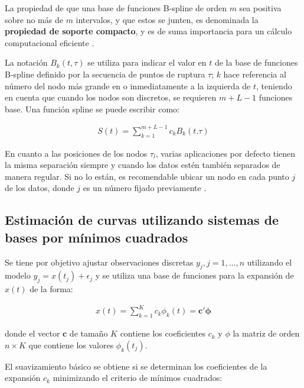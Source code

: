 \documentclass[
]{book}
\begin{document}
La propiedad de que una base de funciones B-spline de orden \(m\) sea positiva sobre no más de \(m\) intervalos, y que estos se junten, es denominada la \textbf{propiedad de soporte compacto}, y es de suma importancia para un cálculo computacional eficiente \citep{ramsay}.

La notación \(B_k(t,\tau)\) se utiliza para indicar el valor en \(t\) de la base de funciones B-spline definido por la secuencia de puntos de ruptura \(\tau\); \(k\) hace referencia al número del nodo más grande en o inmediatamente a la izquierda de \(t\), teniendo en cuenta que cuando los nodos son discretos, se requieren \(m+L-1\) funciones base. Una función spline se puede escribir como:

\begin{align}
    S(t)=\sum_{k=1}^{m+L-1} {c_{k}B_{k}(t.\tau)}
\end{align}

En cuanto a las posiciones de los nodos \(\tau_l\), varias aplicaciones por defecto tienen la misma separación siempre y cuando los datos estén también separados de manera regular. Si no lo están, es recomendable ubicar un nodo en cada punto \(j\) de los datos, donde \(j\) es un número fijado previamente \citep{ramsay}.

\hypertarget{estimaciuxf3n-de-curvas-utilizando-sistemas-de-bases-por-muxednimos-cuadrados}{%
\subsection*{Estimación de curvas utilizando sistemas de bases por mínimos cuadrados}\label{estimaciuxf3n-de-curvas-utilizando-sistemas-de-bases-por-muxednimos-cuadrados}}

Se tiene por objetivo ajustar observaciones discretas \(y_j,j=1,...,n\) utilizando el modelo \(y_j=x(t_j)+\epsilon_j\) y se utiliza una base de funciones para la expansión de \(x(t)\) de la forma:

\begin{align}
    x(t)=\sum_{k=1}^Kc_k\phi_k(t)=\mathbf{c'} \boldsymbol{\phi}
\end{align}

donde el vector \(\textbf{c}\) de tamaño \(K\) contiene los coeficientes \(c_k\) y \(\phi\) la matriz de orden \(n\times K\) que contiene los valores \(\phi_k(t_j)\).

El suavizamiento básico se obtiene si se determinan los coeficientes de la expansión \(c_k\) minimizando el criterio de mínimos cuadrados:
\end{document}
